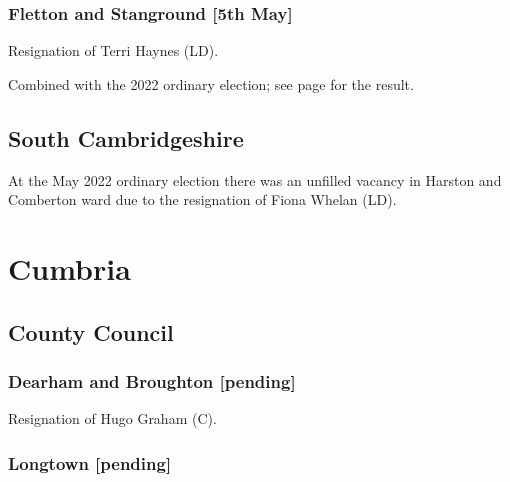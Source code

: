 \documentclass[a4paper,openany]{book}
\begin{document}
\begin{resultsiii}
\subsubsection*{Fletton and Stanground \hspace*{\fill}\nolinebreak[1]%
	\enspace\hspace*{\fill}
	[5th May]}


Resignation of Terri Haynes (LD).

Combined with the 2022 ordinary election; see page \pageref{PeterboroughFlettonStanground} for the result.

\subsection*{South Cambridgeshire}

At the May 2022 ordinary election there was an unfilled vacancy in Harston and Comberton ward due to the resignation of Fiona Whelan (LD).%

\section{Cumbria}

\subsection*{County Council}

\subsubsection*{Dearham and Broughton \hspace*{\fill}\nolinebreak[1]%
	\enspace\hspace*{\fill}
	[pending]}


Resignation of Hugo Graham (C).

\subsubsection*{Longtown \hspace*{\fill}\nolinebreak[1]%
	\enspace\hspace*{\fill}
	[pending]}


\end{resultsiii}
\end{document}
